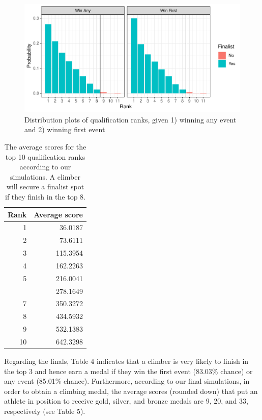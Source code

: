 \documentclass[12pt]{article}
\begin{document}
\begin{figure}

{\centering \includegraphics{draft_files/figure-latex/unnamed-chunk-7-1} 

}

\caption{Distribution plots of qualification ranks, given 1) winning any event and 2) winning first event}\label{fig:unnamed-chunk-7}
\end{figure}

\begin{table}[H]

\caption{\label{tab:unnamed-chunk-8}The average scores for the top 10 qualification ranks according to our simulations. A climber will secure a finalist spot if they finish in the top 8.}
\centering
\begin{tabular}[t]{rr}
\toprule
Rank & Average score\\
\midrule
1 & 36.0187\\
2 & 73.6111\\
3 & 115.3954\\
4 & 162.2263\\
5 & 216.0041\\
\addlinespace
6 & 278.1649\\
7 & 350.3272\\
8 & 434.5932\\
9 & 532.1383\\
10 & 642.3298\\
\bottomrule
\end{tabular}
\end{table}

Regarding the finals, Table 4 indicates that a climber is very likely to
finish in the top 3 and hence earn a medal if they win the first event
(83.03\% chance) or any event (85.01\% chance). Furthermore, according
to our final simulations, in order to obtain a climbing medal, the
average scores (rounded down) that put an athlete in position to receive
gold, silver, and bronze medals are 9, 20, and 33, respectively (see
Table 5).
\end{document}

